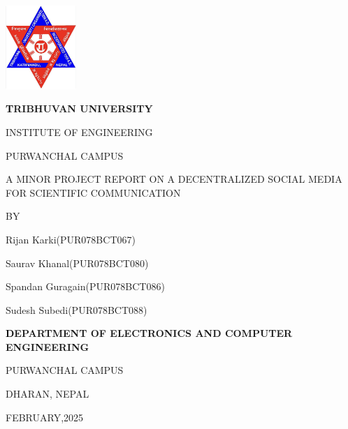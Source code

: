 \begin{titlepage}
    \centering
    
    \includegraphics[width=0.2\textwidth]{Graphics/TULogo.png}\par
    \vspace{1.2cm}
    {\fontsize{14pt}{12pt}\selectfont\bfseries\textcolor{black}
    TRIBHUVAN UNIVERSITY \par INSTITUTE OF ENGINEERING \par PURWANCHAL CAMPUS \par
    \vspace{1.2cm}
    \begin{flushleft}
    
    \end{flushleft}

    \par A MINOR PROJECT REPORT ON A DECENTRALIZED SOCIAL MEDIA FOR SCIENTIFIC COMMUNICATION\par

    \vspace{1.2cm}
    BY\par Rijan Karki(PUR078BCT067)
      \par Saurav Khanal(PUR078BCT080)
      \par Spandan Guragain(PUR078BCT086)
      \par Sudesh Subedi(PUR078BCT088)
    \vspace{1.2cm}\par
    }
    {\fontsize{13pt}{12pt}\selectfont\bfseries\textcolor{black}
    DEPARTMENT OF ELECTRONICS AND COMPUTER ENGINEERING\par PURWANCHAL CAMPUS\par DHARAN, NEPAL\par
    \vspace{1.2cm}
    \vspace{1.2cm}
    
    FEBRUARY,2025 
    }
\end{titlepage}
